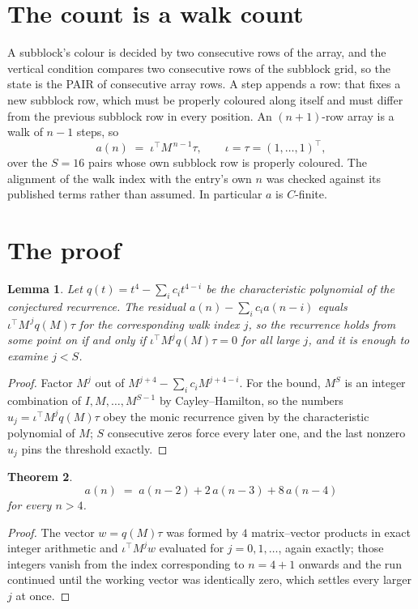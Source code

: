 \documentclass[11pt,a4paper]{article}
\theoremstyle{plain}
\newtheorem{theorem}{Theorem}
\newtheorem{lemma}[theorem]{Lemma}
\theoremstyle{definition}
\begin{document}
\section{The count is a walk count}

A subblock's colour is decided by two consecutive rows of the array, and
the vertical condition compares two consecutive rows of the subblock grid, so the state is the
PAIR of consecutive array rows. A step appends a row: that fixes a new subblock row, which
must be properly coloured along itself and must differ from the previous subblock row in every
position. An $(n+1)$-row array is a walk of $n-1$ steps, so
\[
a(n)\;=\;\iota^{\!\top}M^{\,n-1}\tau,\qquad\iota=\tau=(1,\dots,1)^{\!\top},
\]
over the $S=16$ pairs whose own subblock row is properly coloured.
The alignment of the walk index with the entry's own $n$ was checked against its published
terms rather than assumed. In particular $a$ is $C$-finite.

\section{The proof}

\begin{lemma}\label{lem:crit}
Let $q(t)=t^{4}-\sum_i c_it^{4-i}$ be the characteristic polynomial of the
conjectured recurrence. The residual $a(n)-\sum_ic_ia(n-i)$ equals
$\iota^{\!\top}M^{\,j}q(M)\tau$ for the corresponding walk index $j$, so the recurrence
holds from some point on if and only if $\iota^{\!\top}M^{j}q(M)\tau=0$ for all large $j$,
and it is enough to examine $j<S$.
\end{lemma}

\begin{proof}
Factor $M^{j}$ out of $M^{j+4}-\sum_ic_iM^{j+4-i}$. For the bound, $M^{S}$
is an integer combination of $I,M,\dots,M^{S-1}$ by Cayley--Hamilton, so the numbers
$u_j=\iota^{\!\top}M^{j}q(M)\tau$ obey the monic recurrence given by the characteristic
polynomial of $M$; $S$ consecutive zeros force every later one, and the last nonzero $u_j$
pins the threshold exactly.
\end{proof}

\begin{theorem}
\[
a(n)\;=\;a(n-2) + 2\,a(n-3) + 8\,a(n-4)
\]
for every $n>4$.
\end{theorem}

\begin{proof}
The vector $w=q(M)\tau$ was formed by $4$ matrix--vector products in exact integer
arithmetic and $\iota^{\!\top}M^{j}w$ evaluated for $j=0,1,\dots$, again exactly; those
integers vanish from the index corresponding to $n=4+1$ onwards and the run continued
until the working vector was identically zero, which settles every larger $j$ at once.
\end{proof}
\end{document}

